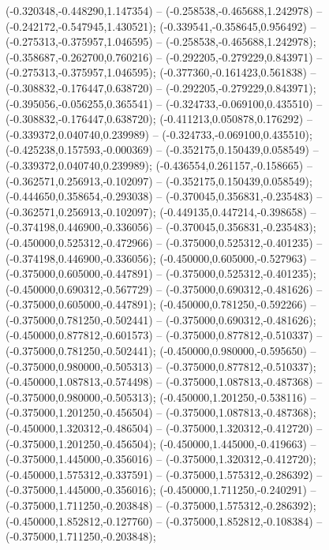  (-0.320348,-0.448290,1.147354) -- (-0.258538,-0.465688,1.242978) -- (-0.242172,-0.547945,1.430521);
 (-0.339541,-0.358645,0.956492) -- (-0.275313,-0.375957,1.046595) -- (-0.258538,-0.465688,1.242978);
 (-0.358687,-0.262700,0.760216) -- (-0.292205,-0.279229,0.843971) -- (-0.275313,-0.375957,1.046595);
 (-0.377360,-0.161423,0.561838) -- (-0.308832,-0.176447,0.638720) -- (-0.292205,-0.279229,0.843971);
 (-0.395056,-0.056255,0.365541) -- (-0.324733,-0.069100,0.435510) -- (-0.308832,-0.176447,0.638720);
 (-0.411213,0.050878,0.176292) -- (-0.339372,0.040740,0.239989) -- (-0.324733,-0.069100,0.435510);
 (-0.425238,0.157593,-0.000369) -- (-0.352175,0.150439,0.058549) -- (-0.339372,0.040740,0.239989);
 (-0.436554,0.261157,-0.158665) -- (-0.362571,0.256913,-0.102097) -- (-0.352175,0.150439,0.058549);
 (-0.444650,0.358654,-0.293038) -- (-0.370045,0.356831,-0.235483) -- (-0.362571,0.256913,-0.102097);
 (-0.449135,0.447214,-0.398658) -- (-0.374198,0.446900,-0.336056) -- (-0.370045,0.356831,-0.235483);
 (-0.450000,0.525312,-0.472966) -- (-0.375000,0.525312,-0.401235) -- (-0.374198,0.446900,-0.336056);
 (-0.450000,0.605000,-0.527963) -- (-0.375000,0.605000,-0.447891) -- (-0.375000,0.525312,-0.401235);
 (-0.450000,0.690312,-0.567729) -- (-0.375000,0.690312,-0.481626) -- (-0.375000,0.605000,-0.447891);
 (-0.450000,0.781250,-0.592266) -- (-0.375000,0.781250,-0.502441) -- (-0.375000,0.690312,-0.481626);
 (-0.450000,0.877812,-0.601573) -- (-0.375000,0.877812,-0.510337) -- (-0.375000,0.781250,-0.502441);
 (-0.450000,0.980000,-0.595650) -- (-0.375000,0.980000,-0.505313) -- (-0.375000,0.877812,-0.510337);
 (-0.450000,1.087813,-0.574498) -- (-0.375000,1.087813,-0.487368) -- (-0.375000,0.980000,-0.505313);
 (-0.450000,1.201250,-0.538116) -- (-0.375000,1.201250,-0.456504) -- (-0.375000,1.087813,-0.487368);
 (-0.450000,1.320312,-0.486504) -- (-0.375000,1.320312,-0.412720) -- (-0.375000,1.201250,-0.456504);
 (-0.450000,1.445000,-0.419663) -- (-0.375000,1.445000,-0.356016) -- (-0.375000,1.320312,-0.412720);
 (-0.450000,1.575312,-0.337591) -- (-0.375000,1.575312,-0.286392) -- (-0.375000,1.445000,-0.356016);
 (-0.450000,1.711250,-0.240291) -- (-0.375000,1.711250,-0.203848) -- (-0.375000,1.575312,-0.286392);
 (-0.450000,1.852812,-0.127760) -- (-0.375000,1.852812,-0.108384) -- (-0.375000,1.711250,-0.203848);
